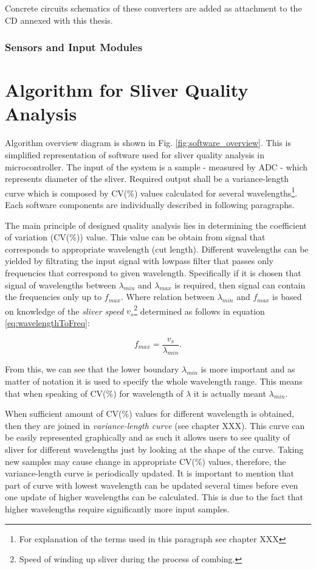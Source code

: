 \documentclass[twoside]{ctuthesis}
\theoremstyle{plain}
\theoremstyle{definition}
\theoremstyle{note}
\begin{document}
Concrete circuits schematics of these converters are added as attachment to the CD annexed with this thesis.

\subsubsection{Sensors and Input Modules}
\label{sec:Sensors}


\section{Algorithm for Sliver Quality Analysis}
Algorithm overview diagram is shown in Fig. \ref{fig:software_overview}. This is simplified representation of software used for sliver quality analysis in microcontroller. The input of the system is a sample - measured by ADC - which represents diameter of the sliver. Required output shall be a variance-length curve which is composed by CV(\%) values calculated for several wavelengths\footnote{\label{footnote1:textileTerms}For explanation of the terms used in this paragraph see chapter XXX}. Each software components are individually described in following paragraphs.

The main principle of designed quality analysis lies in determining the coefficient of variation (CV(\%)) value. This value can be obtain from signal that corresponds to appropriate wavelength (cut length). Different wavelengths can be yielded by filtrating the input signal with lowpass filter that passes only frequencies that correspond to given wavelength. Specifically if it is chosen that signal of wavelengths between $\lambda_{min}$ and $\lambda_{max}$ is required, then signal can contain the frequencies only up to $f_{max}$. Where relation between $\lambda_{min}$ and $f_{max}$ is based on knowledge of the \textit{sliver speed} $v_{s}$\footnote{Speed of winding up sliver during the process of combing.} determined as follows in equation \ref{eq:wavelengthToFreq}:

\begin{equation} \label{eq:wavelengthToFreq}
f_{max} = \frac{v_{s}}{\lambda_{min}}.
\end{equation}

From this, we can see that the lower boundary $\lambda_{min}$ is more important and as matter of notation it is used to specify the whole wavelength range. This means that when speaking of CV(\%) for wavelength of $\lambda$ it is actually meant $\lambda_{min}$.

When sufficient amount of CV(\%) values for different wavelength is obtained, then they are joined in \textit{variance-length curve} (see chapter XXX). This curve can be easily represented graphically and as such it allows users to see quality of sliver for different wavelengths just by looking at the shape of the curve. Taking new samples may cause change in appropriate CV(\%) values, therefore, the variance-length curve is periodically updated. It is important to mention that part of curve with lowest wavelength can be updated several times before even one update of higher wavelengths can be calculated. This is due to the fact that higher wavelengths require significantly more input samples.
\end{document}
